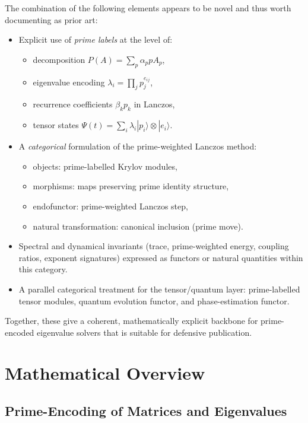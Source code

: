 \documentclass[11pt]{article}
\begin{document}
The combination of the following elements appears to be novel and thus
worth documenting as prior art:
\begin{itemize}
  \item Explicit use of \emph{prime labels} at the level of:
    \begin{itemize}
      \item decomposition $P(A)=\sum_p \alpha_p p A_p$,
      \item eigenvalue encoding $\lambda_i=\prod_j p_j^{e_{ij}}$,
      \item recurrence coefficients $\beta_k p_k$ in Lanczos,
      \item tensor states $\Psi(t)=\sum_i \lambda_i |p_i\rangle\otimes|e_i\rangle$.
    \end{itemize}
  \item A \emph{categorical} formulation of the prime-weighted Lanczos
    method:
    \begin{itemize}
      \item objects: prime-labelled Krylov modules,
      \item morphisms: maps preserving prime identity structure,
      \item endofunctor: prime-weighted Lanczos step,
      \item natural transformation: canonical inclusion (prime move).
    \end{itemize}
  \item Spectral and dynamical invariants (trace, prime-weighted energy,
    coupling ratios, exponent signatures) expressed as functors or
    natural quantities within this category.
  \item A parallel categorical treatment for the tensor/quantum layer:
    prime-labelled tensor modules, quantum evolution functor, and
    phase-estimation functor.
\end{itemize}

Together, these give a coherent, mathematically explicit backbone for
prime-encoded eigenvalue solvers that is suitable for defensive
publication.

\section{Mathematical Overview}

\subsection{Prime-Encoding of Matrices and Eigenvalues}
\end{document}
